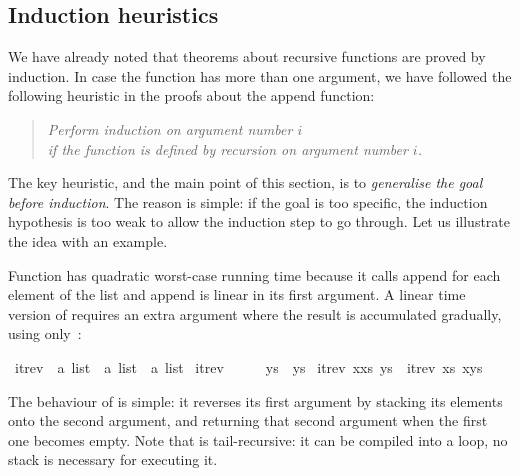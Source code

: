 \begin{isabellebody}
\begin{isamarkuptxt}
\section{Induction heuristics}

We have already noted that theorems about recursive functions are proved by
induction. In case the function has more than one argument, we have followed
the following heuristic in the proofs about the append function:
\begin{quote}
\emph{Perform induction on argument number $i$\\
 if the function is defined by recursion on argument number $i$.}
\end{quote}
The key heuristic, and the main point of this section, is to
\emph{generalise the goal before induction}.
The reason is simple: if the goal is
too specific, the induction hypothesis is too weak to allow the induction
step to go through. Let us illustrate the idea with an example.

Function  has quadratic worst-case running time
because it calls append for each element of the list and
append is linear in its first argument.  A linear time version of
 requires an extra argument where the result is accumulated
gradually, using only~:%
\end{isamarkuptxt}%
\isamarkuptrue%
%
\endisatagproof
{\isafoldproof}%
%
\isadelimproof
%
\endisadelimproof
{}\isamarkupfalse%
\ itrev\ {}{}\ {}{}a\ list\ {}\ {}a\ list\ {}\ {}a\ list{}\ \isanewline
{}itrev\ {}{}\ \ \ \ \ ys\ {}\ ys{}\ {}\isanewline
{}itrev\ {}x{}xs{}\ ys\ {}\ itrev\ xs\ {}x{}ys{}{}%
\begin{isamarkuptext}%
The behaviour of  is simple: it reverses
its first argument by stacking its elements onto the second argument,
and returning that second argument when the first one becomes
empty. Note that  is tail-recursive: it can be
compiled into a loop, no stack is necessary for executing it.


\end{isamarkuptext}
\end{isabellebody}
